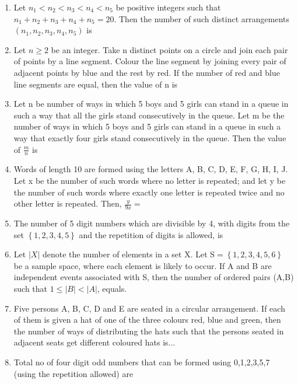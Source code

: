 \begin{enumerate}[label=\arabic*.,ref=\thesubsection.\theenumi]
\item Let $n_1<n_2<n_3<n_4<n_5$ be positive integers such that $n_1+n_2+n_3+n_4+n_5=20.$ Then the number of such distinct arrangements $(n_1,n_2,n_3,n_4,n_5)$ is\\
\item Let $n\geq2$ be an integer. Take n distinct points on a circle and join each pair of points by a line segment. Colour the line segment by joining every pair of adjacent points by blue and the rest by red. If the number of red and blue line segments are equal, then the value of n is\\
\item Let n be number of ways in which 5 boys and 5 girls can stand in a queue in such a way that all the girls stand consecutively in the queue. Let m be the number of ways in which 5 boys and 5 girls can stand in a queue in such a way that exactly four girls stand consecutively in the queue. Then the value of $\frac{m}{n}$ is\\
\item Words of length 10 are formed using the letters A, B, C, D, E, F, G, H, I, J. Let x be the number of such words where no letter is repeated; and let y be the number of such words where exactly one letter is repeated twice and no other letter is repeated. Then, $\frac{y}{9x} = $\\
\item The number of 5 digit numbers which are divisible by 4, with digits from the set $\left\lbrace1,2,3,4,5\right\rbrace$ and the repetition of digits is allowed, is\\
\item Let $\vert X \vert$ denote the number of elements in a set X. Let S$=\left\lbrace1,2,3,4,5,6\right\rbrace$ be a sample space, where each element is likely to occur. If A and B are independent events associated with S, then the number of ordered pairs (A,B) such that $1\leq\vert B \vert < \vert A \vert$, equals.\\
\item Five persons A, B, C, D and E are seated in a circular arrangement. If each of them is given a hat of one of the three colours red, blue and green, then the number of ways of distributing the hats such that the persons seated in adjacent seats get different coloured hats is...\\ 
\item Total no of four digit odd numbers that can be formed using 0,1,2,3,5,7 (using the repetition allowed) are
\begin{enumerate}

\end{enumerate}
\end{enumerate}
